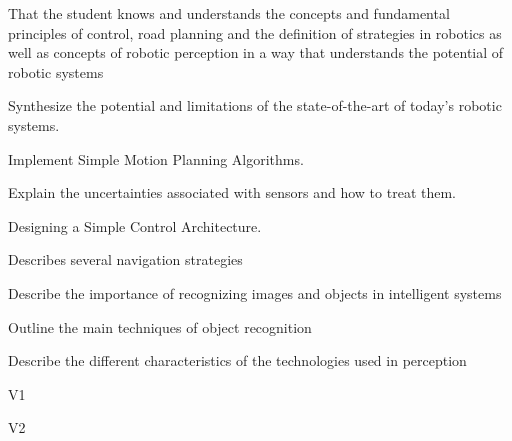\begin{syllabus}


\begin{justification}
That the student knows and understands the concepts and fundamental principles of control, road planning and the definition of strategies in robotics as well as concepts of robotic perception 
in a way that understands the potential of robotic systems
\end{justification}

\begin{goals}
\item Synthesize the potential and limitations of the state-of-the-art of today's robotic systems.
\item Implement Simple Motion Planning Algorithms.
\item Explain the uncertainties associated with sensors and how to treat them.
\item Designing a Simple Control Architecture.
\item Describes several navigation strategies
\item Describe the importance of recognizing images and objects in intelligent systems
\item Outline the main techniques of object recognition
\item Describe the different characteristics of the technologies used in perception
\end{goals}

\begin{outcomes}{V1}
    \item {}
    \item {}
    \item {}
    \item {}
    \item {}
\end{outcomes}

\begin{outcomes}{V2}
    \item {}
    \item {}
    \item {}
    \item {}
\end{outcomes}


\end{syllabus}
